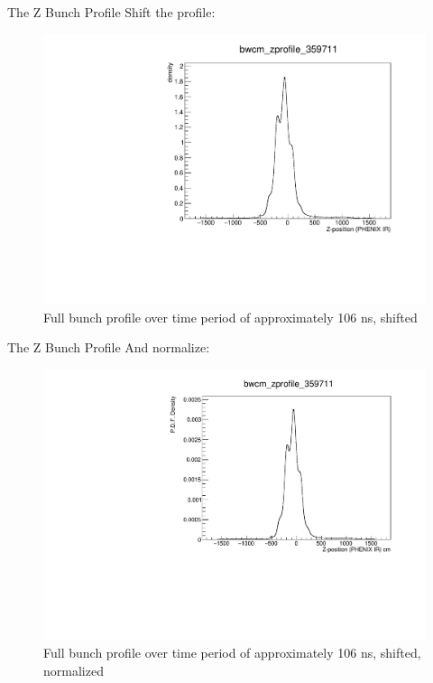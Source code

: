 \begin{frame}{The Z Bunch Profile}
Shift the profile:
\begin{figure}
\begin{center}
\includegraphics[width=0.6\linewidth]{../ZBunchProfileStudies/figs/bwcm_zprofile_359711_shifted.pdf}
\end{center}
\caption{Full bunch profile over time period of approximately 106 ns, shifted}
\label{fig:bwcm_zprofile_359711_shifted}
\end{figure}
\end{frame}

\begin{frame}{The Z Bunch Profile}
And normalize:
\begin{figure}
\begin{center}
\includegraphics[width=0.6\linewidth]{../ZBunchProfileStudies/figs/bwcm_zprofile_359711_density.pdf}
\end{center}
\caption{Full bunch profile over time period of approximately 106 ns, shifted, normalized}
\label{fig:bwcm_zprofile_359711_density}
\end{figure}
\end{frame}

